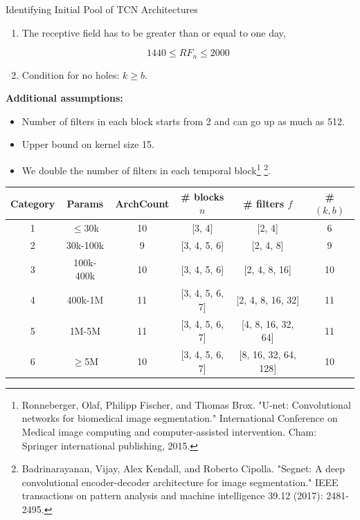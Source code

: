 \documentclass[8pt,xcolor=dvipsnames,compress]{beamer}
\begin{document}
\begin{frame}{Identifying Initial Pool of TCN Architectures}
\begin{enumerate}
    \item The receptive field has to be greater than or equal to one day,

    \begin{equation}
    1440 \le RF_n \le 2000
    \end{equation}

\item Condition for no holes: $k \ge b$.
\end{enumerate}
\textbf{Additional assumptions:}
\begin{itemize}
\item Number of filters in each block starts from 2 and can go up as much as 512.\\
\item Upper bound on kernel size 15. \\
\item We double the number of filters in each temporal block\footnote{Ronneberger, Olaf, Philipp Fischer, and Thomas Brox. "U-net: Convolutional networks for biomedical image segmentation." International Conference on Medical image computing and computer-assisted intervention. Cham: Springer international publishing, 2015.} \footnote{Badrinarayanan, Vijay, Alex Kendall, and Roberto Cipolla. "Segnet: A deep convolutional encoder-decoder architecture for image segmentation." IEEE transactions on pattern analysis and machine intelligence 39.12 (2017): 2481-2495.}. 
\end{itemize}


\begin{table}[htbp]
\centering
\begin{tabular}{|cccccc|}
\toprule
\hline
\textbf{Category} & \textbf{Params}& \textbf{ArchCount} & \textbf{\# blocks $n$} & \textbf{\# filters $f$} & \textbf{\# $(k, b)$} \\
\midrule
\hline
1 & $\le$30k & 10 & [3, 4] & [2, 4] & 6 \\
2 & 30k-100k & 9 & [3, 4, 5, 6] & [2, 4, 8] & 9 \\
3 & 100k-400k & 10 & [3, 4, 5, 6] & [2, 4, 8, 16] & 10 \\
4 & 400k-1M & 11 & [3, 4, 5, 6, 7] & [2, 4, 8, 16, 32] & 11 \\
5 & 1M-5M & 11 & [3, 4, 5, 6, 7] & [4, 8, 16, 32, 64] & 11  \\
6 & $\ge$5M & 10 & [3, 4, 5, 6, 7] & [8, 16, 32, 64, 128] & 10 \\
\bottomrule
\hline
\end{tabular}
\label{tab:tcn_param_bins_full}
\end{table}
\end{frame}
\end{document}
